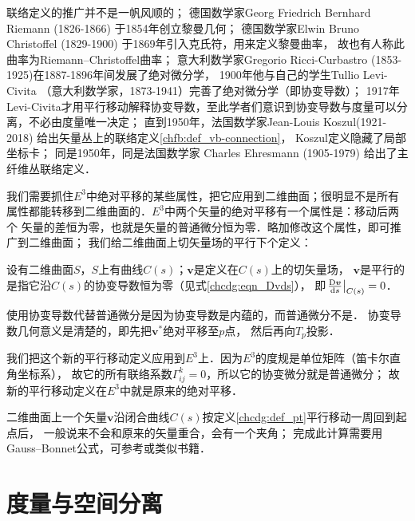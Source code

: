 联络定义的推广并不是一帆风顺的；
德国数学家Georg Friedrich Bernhard Riemann (1826-1866) 于1854年创立黎曼几何；
德国数学家Elwin Bruno Christoffel (1829-1900) 于1869年引入克氏符，用来定义黎曼曲率，
故也有人称此曲率为Riemann--Christoffel曲率；
意大利数学家Gregorio Ricci-Curbastro (1853-1925)在1887-1896年间发展了绝对微分学，
1900年他与自己的学生Tullio Levi-Civita （意大利数学家，1873-1941）完善了绝对微分学（即协变导数）；
1917年Levi-Civita才用平行移动解释协变导数，至此学者们意识到协变导数与度量可以分离，不必由度量唯一决定；
直到1950年，法国数学家Jean-Louis Koszul(1921-2018) 给出矢量丛上的联络定义\ref{chfb:def_vb-connection}，
Koszul定义隐藏了局部坐标卡；
同是1950年，同是法国数学家 Charles Ehresmann (1905-1979) 给出了主纤维丛联络定义．


我们需要抓住$E^3$中绝对平移的某些属性，把它应用到二维曲面；很明显不是所有
属性都能转移到二维曲面的．$E^3$中两个矢量的绝对平移有一个属性是：移动后两个
矢量的差恒为零，也就是矢量的普通微分恒为零．略加修改这个属性，即可推广到二维曲面；
我们给二维曲面上切矢量场的{\kaishu 平行}下个定义：

\begin{definition}\label{chcdg:def_pt}
    设有二维曲面$S$，$S$上有曲线$C(s)$；$\boldsymbol{v}$是定义在$C(s)$上的切矢量场，
    $\boldsymbol{v}$是{\heiti 平行的}是指它沿$C(s)$的协变导数恒为零（见式\eqref{chcdg:eqn_Dvds}），
    即$\left.\frac{{\rm D} \boldsymbol{v}}{{\rm d}s}\right|_{C(s)}=0$．
\end{definition}

使用协变导数代替普通微分是因为协变导数是内蕴的，而普通微分不是．
协变导数几何意义是清楚的，即先把$\boldsymbol{v}^*$绝对平移至$p$点，
然后再向$T_p$投影．

我们把这个新的平行移动定义应用到$E^3$上．因为$E^3$的度规是单位矩阵（笛卡尔直角坐标系），
故它的所有联络系数$\Gamma^k_{ij}=0$，所以它的协变微分就是普通微分；
故新的平行移动定义在$E^3$中就是原来的绝对平移．




二维曲面上一个矢量$\boldsymbol{v}$沿闭合曲线$C(s)$按定义\ref{chcdg:def_pt}平行移动一周回到起点后，
一般说来不会和原来的矢量重合，会有一个夹角；
完成此计算需要用Gauss--Bonnet公式，可参考\parencite[\S 2.7.4]{subq-2016}或类似书籍．






\section{度量与空间分离}\label{chcdg:sec_sm}

